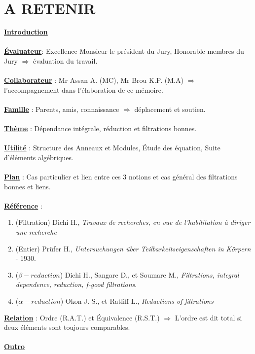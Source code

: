 \documentclass[12pt, a4paper, oneside]{article}
\begin{document}
	\section{A RETENIR}
	
	\underline{\textbf{Introduction}}\\\\
	\underline{\textbf{Évaluateur}}: Excellence Monsieur le président du Jury, Honorable membres du Jury $\Longrightarrow $ évaluation du travail. \\\\
	\underline{\textbf{Collaborateur}} : Mr Assan A. (MC), Mr Brou K.P. (M.A) $\Longrightarrow $ l'accompagnement dans l'élaboration de ce mémoire. \\\\
	\underline{\textbf{Famille}} : Parents, amis, connaissance $\Longrightarrow $ déplacement et soutien. \\\\
	\underline{\textbf{Thème}} : Dépendance intégrale, réduction et filtrations bonnes.\\\\
	\underline{\textbf{Utilité}} : Structure des Anneaux et Modules, Étude des équation, Suite d'éléments algébriques.\\\\
	\underline{\textbf{Plan}} : Cas particulier et lien entre ces 3 notions et cas général des filtrations bonnes et liens.\\\\
	\underline{\textbf{Référence}} :
	\begin{enumerate}
		\item (Filtration) Dichi H., \textit{Travaux de recherches, en vue de l'habilitation à diriger une recherche}
		\item (Entier) Prüfer H.,\textit{ Untersuchungen über Teilbarkeitseigenschaften in Körpern} - 1930.
		\item ($\beta-reduction$) Dichi H., Sangare D., et Soumare M.,\textit{ Filtrations, integral dependence, reduction, f-good filtrations}.
		\item ($\alpha-reduction$) Okon J. S., et Ratliff L.,\textit{ Reductions of filtrations}
	\end{enumerate}
	\underline{\textbf{Relation}} : Ordre (R.A.T.) et Équivalence (R.S.T.) $\Longrightarrow $ L'ordre est dit total si deux éléments sont toujours comparables.\\\\
	\underline{\textbf{Outro}}\\\\
\end{document}
